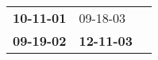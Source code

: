 \begin{supertabular}{p{0.33\columnwidth}p{0.33\columnwidth}p{0.33\columnwidth}}
 \textbf{10-11-01\textsuperscript{}} &           09-18-03\textsuperscript{} \\
 \textbf{09-19-02\textsuperscript{}} &  \textbf{12-11-03\textsuperscript{}} \\
\end{supertabular}
